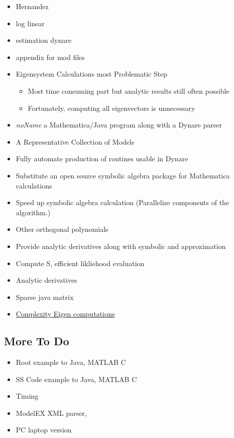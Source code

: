 \documentclass[12pt]{article}
\begin{document}
\begin{itemize}
  \item Hernandez
  \item log linear
  \item estimation dynare
  \item appendix for mod files
\item Eigensystem Calculations most Problematic Step
  \begin{itemize}
  \item Most time consuming part but analytic results still often possible
  \item Fortunately, computing all eigenvectors is unnecessary
  \end{itemize}
  \item {\em noName} a Mathematica/Java program along with a Dynare parser
  \item  A Representative Collection of Models
  \end{itemize}



  \begin{itemize}
  \item Fully automate production of routines usable in Dynare
  \item Substitute an open source symbolic algebra package for Mathematica calculations
  \item Speed up symbolic algebra calculation (Parallelize components of the algorithm.)
  \item Other orthogonal polynomials
\item Provide analytic derivatives along with symbolic and approximation
\item Compute S, efficient likliehood evaluation
\item Analytic derivatives
\item Sparse java matrix
\item \href{http://cstheory.stackexchange.com/questions/2611/complexity-of-finding-the-eigendecomposition-of-a-matrix}{Complexity Eigen computations}
  \end{itemize}


  \subsection{More To Do}
  \begin{itemize}
  \item Root example  to Java, MATLAB C
  \item SS Code example to Java, MATLAB C
  \item Timing
  \item ModelEX XML parser,
  \item PC laptop version
  \end{itemize}
\end{document}
